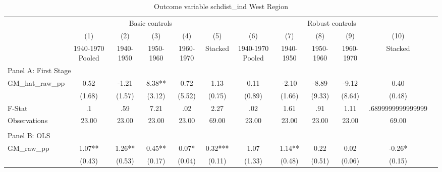  \begin{table}[htbp]\centering {} \begin{threeparttable} \caption{Outcome variable schdist\_ind West Region} \begin{tabular}{l*{11}{c}} \toprule
          &\multicolumn{5}{c}{Basic controls}                                   &\multicolumn{5}{c}{Robust controls}                                  \\\cmidrule(lr){2-6}\cmidrule(lr){7-11}
          &\multicolumn{1}{c}{(1)}&\multicolumn{1}{c}{(2)}&\multicolumn{1}{c}{(3)}&\multicolumn{1}{c}{(4)}&\multicolumn{1}{c}{(5)}&\multicolumn{1}{c}{(6)}&\multicolumn{1}{c}{(7)}&\multicolumn{1}{c}{(8)}&\multicolumn{1}{c}{(9)}&\multicolumn{1}{c}{(10)}\\
          &\multicolumn{1}{c}{1940-1970 Pooled}&\multicolumn{1}{c}{1940-1950}&\multicolumn{1}{c}{1950-1960}&\multicolumn{1}{c}{1960-1970}&\multicolumn{1}{c}{Stacked}&\multicolumn{1}{c}{1940-1970 Pooled}&\multicolumn{1}{c}{1940-1950}&\multicolumn{1}{c}{1950-1960}&\multicolumn{1}{c}{1960-1970}&\multicolumn{1}{c}{Stacked}\\
\cmidrule(lr){1-11}
\multicolumn{10}{l}{Panel A: First Stage}\\
\cmidrule(lr){1-11}
GM\_hat\_raw\_pp&      0.52   &     -1.21   &      8.38** &      0.72   &      1.13   &      0.11   &     -2.10   &     -8.89   &     -9.12   &      0.40   \\
          &    (1.68)   &    (1.57)   &    (3.12)   &    (5.52)   &    (0.75)   &    (0.89)   &    (1.66)   &    (9.33)   &    (8.64)   &    (0.48)   \\
\midrule
F-Stat    &        .1   &       .59   &      7.21   &       .02   &      2.27   &       .02   &      1.61   &       .91   &      1.11   &.6899999999999999   \\
Observations&     23.00   &     23.00   &     23.00   &     23.00   &     69.00   &     23.00   &     23.00   &     23.00   &     23.00   &     69.00   \\
\cmidrule[\heavyrulewidth](lr){1-11} \\ \cmidrule[\heavyrulewidth](lr){1-11}
\multicolumn{10}{l}{Panel B: OLS}\\
\cmidrule(lr){1-11}
GM\_raw\_pp &      1.07** &      1.26** &      0.45** &      0.07*  &      0.32***&      1.07   &      1.14** &      0.22   &      0.02   &     -0.26*  \\
          &    (0.43)   &    (0.53)   &    (0.17)   &    (0.04)   &    (0.11)   &    (1.33)   &    (0.48)   &    (0.51)   &    (0.06)   &    (0.15)   \\

\end{tabular}
\end{threeparttable}
\end{table}
